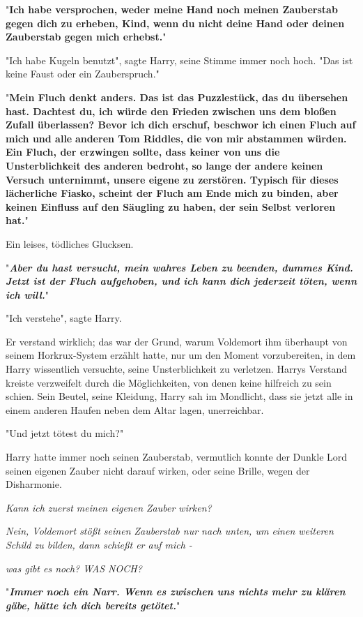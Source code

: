 {"\textbf{Ich habe versprochen, weder meine Hand noch meinen Zauberstab gegen dich zu erheben, Kind, wenn du nicht deine Hand oder deinen Zauberstab gegen mich erhebst.}"

"Ich habe Kugeln benutzt", sagte Harry, seine Stimme immer noch hoch. "Das ist keine Faust oder ein Zauberspruch."

"\textbf{Mein Fluch denkt anders. Das ist das Puzzlestück, das du übersehen hast. Dachtest du, ich würde den Frieden zwischen uns dem bloßen Zufall überlassen? Bevor ich dich erschuf, beschwor ich einen Fluch auf mich und alle} \textbf{anderen Tom Riddles, die von mir abstammen würden. Ein Fluch, der erzwingen sollte, dass keiner von uns die Unsterblichkeit des anderen bedroht, so lange der andere keinen Versuch unternimmt, unsere eigene zu zerstören. Typisch für dieses lächerliche Fiasko, scheint der Fluch am Ende mich zu binden, aber keinen Einfluss auf den Säugling zu haben, der sein Selbst verloren hat.}"

Ein leises, tödliches Glucksen.

"\textbf{\emph{Aber du hast versucht, mein wahres Leben zu beenden, dummes Kind. Jetzt ist der Fluch aufgehoben, und ich kann dich jederzeit töten, wenn ich will.}}"

"Ich verstehe", sagte Harry.

Er verstand wirklich; das war der Grund, warum Voldemort ihm überhaupt von seinem Horkrux-System erzählt hatte, nur um den Moment vorzubereiten, in dem Harry wissentlich versuchte, seine Unsterblichkeit zu verletzen. Harrys Verstand kreiste verzweifelt durch die Möglichkeiten, von denen keine hilfreich zu sein schien. Sein Beutel, seine Kleidung, Harry sah im Mondlicht, dass sie jetzt alle in einem anderen Haufen neben dem Altar lagen, unerreichbar.

"Und jetzt tötest du mich?"

Harry hatte immer noch seinen Zauberstab, vermutlich konnte der Dunkle Lord seinen eigenen Zauber nicht darauf wirken, oder seine Brille, wegen der Disharmonie.

\emph{Kann ich zuerst meinen eigenen Zauber wirken?}

\emph{Nein, Voldemort stößt seinen Zauberstab nur nach unten, um einen weiteren Schild zu bilden, dann schießt er auf mich -}

\emph{was gibt es noch? WAS NOCH?}

"\textbf{\emph{Immer noch ein Narr. Wenn es zwischen uns nichts mehr zu klären gäbe, hätte ich dich bereits getötet.}}"

}
